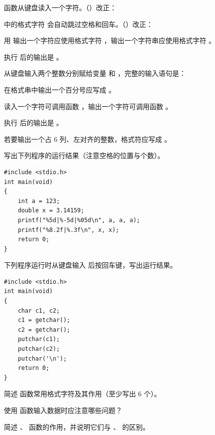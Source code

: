 \documentclass[a4paper,11pt]{article}
\begin{document}
\q {} 函数从键盘读入一个字符。\quad（\quad）\quad 改正：\fixblank

\q {} 中的格式字符  会自动跳过空格和回车。\quad（\quad）\quad 改正：\fixblank


\q 用  输出一个字符应使用格式字符 \fillblank{}，输出一个字符串应使用格式字符 \fillblank{}。

\q 执行  后的输出是 \fillblank{}。

\q 从键盘输入两个整数分别赋给变量  和 ，完整的输入语句是：
\par\noindent\hspace{1.8em}\fillblanks[1.8cm]\code{,}\fillblanks[2.6cm]\code{);}

\q 在格式串中输出一个百分号应写成 \fillblank{}。

\q 读入一个字符可调用函数 \fillblank{}，输出一个字符可调用函数 \fillblank{}。

\q 执行  后的输出是 \fillblank{}。

\q 若要输出一个占 6 列、左对齐的整数，格式符应写成 \fillblank{}。


\q 写出下列程序的运行结果（注意空格的位置与个数）。
\begin{lstlisting}[language={[custom]C}]
#include <stdio.h>
int main(void)
{
    int a = 123;
    double x = 3.14159;
    printf("%5d|%-5d|%05d\n", a, a, a);
    printf("%8.2f|%.3f\n", x, x);
    return 0;
}
\end{lstlisting}
\anslines{2.4cm}

\q 下列程序运行时从键盘输入  后按回车键，写出运行结果。
\begin{lstlisting}[language={[custom]C}]
#include <stdio.h>
int main(void)
{
    char c1, c2;
    c1 = getchar();
    c2 = getchar();
    putchar(c1);
    putchar(c2);
    putchar('\n');
    return 0;
}
\end{lstlisting}
\anslines{2.4cm}


\q 简述  函数常用格式字符及其作用（至少写出 6 个）。\anslines{3.0cm}

\q 使用  函数输入数据时应注意哪些问题？\anslines{3.2cm}

\q 简述 、 函数的作用，并说明它们与 、 的区别。\anslines{3.0cm}
\end{document}
